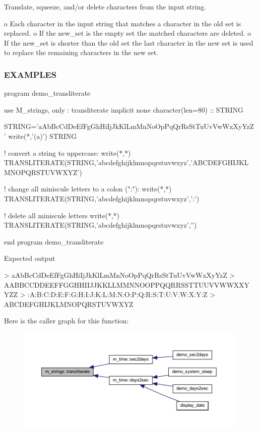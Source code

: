 Translate, squeeze, and/or delete characters from the input string.

o Each character in the input string that matches a character in the old set is replaced. o If the new\+\_\+set is the empty set the matched characters are deleted. o If the new\+\_\+set is shorter than the old set the last character in the new set is used to replace the remaining characters in the new set.

\subsubsection*{E\+X\+A\+M\+P\+L\+ES}

\begin{DoxyVerb}program demo_transliterate

 use M_strings, only : transliterate
 implicit none
 character(len=80)   :: STRING

 STRING='aAbBcCdDeEfFgGhHiIjJkKlLmMnNoOpPqQrRsStTuUvVwWxXyYzZ'
 write(*,'(a)') STRING

 ! convert a string to uppercase:
 write(*,*) TRANSLITERATE(STRING,'abcdefghijklmnopqrstuvwxyz','ABCDEFGHIJKLMNOPQRSTUVWXYZ')

 ! change all miniscule letters to a colon (":"):
 write(*,*) TRANSLITERATE(STRING,'abcdefghijklmnopqrstuvwxyz',':')

 ! delete all miniscule letters
 write(*,*) TRANSLITERATE(STRING,'abcdefghijklmnopqrstuvwxyz','')

end program demo_transliterate

Expected output

 > aAbBcCdDeEfFgGhHiIjJkKlLmMnNoOpPqQrRsStTuUvVwWxXyYzZ
 > AABBCCDDEEFFGGHHIIJJKKLLMMNNOOPPQQRRSSTTUUVVWWXXYYZZ
 > :A:B:C:D:E:F:G:H:I:J:K:L:M:N:O:P:Q:R:S:T:U:V:W:X:Y:Z
 > ABCDEFGHIJKLMNOPQRSTUVWXYZ \end{DoxyVerb}
 Here is the caller graph for this function\+:
\nopagebreak
\begin{figure}[H]
\begin{center}
\leavevmode
\includegraphics[width=350pt]{namespacem__strings_aaee428861205782e002f5e7e8fb002f0_icgraph}
\end{center}
\end{figure}
\mbox{\label{namespacem__strings_a956638e87e83520f170ccefefac6722b}} 
